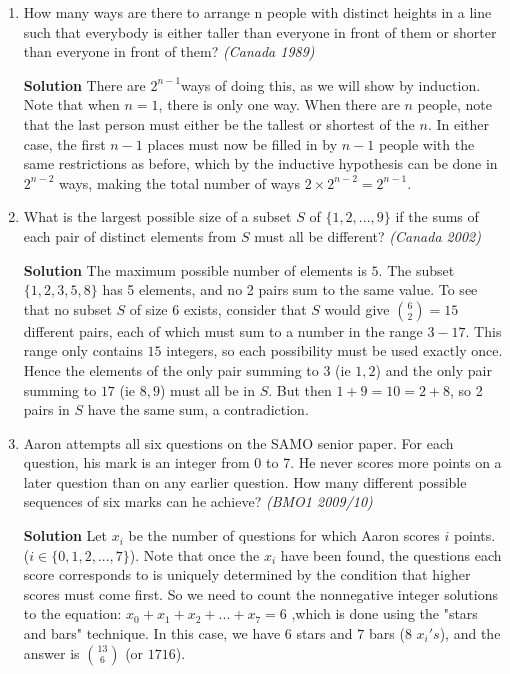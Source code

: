\documentclass[10pt,a4paper]{article}
\begin{document}
\begin{enumerate}

\item How many ways are there to arrange n people with distinct heights in a line such that everybody is either taller than everyone in front of them or shorter than everyone in front of them?
 \textit{(Canada 1989)} 

\textbf{Solution} There are ${2}^{n-1}$ways of doing this, as we will show by induction. Note that when $n=1$, there is only one way. When there are $n$ people, note that the last person must either be the tallest or shortest of the $n$. In either case, the first $n-1$ places must now be filled in by $n-1$ people with the same restrictions as before, which by the inductive hypothesis can be done in $2^{n-2}$ ways, making the total number of ways $2\times 2^{n-2} = 2^{n-1}$.

\item What is the largest possible size of a subset $S$ of $\{1,2,...,9\}$ if the sums of each pair of distinct elements from $S$ must all be different? 
\textit{(Canada 2002)}

\textbf{Solution} The maximum possible number of elements is $5$. The subset $\{1,2,3,5,8\}$ has 5 elements, and no 2 pairs sum to the same value. To see that no subset $S$ of size 6 exists, consider that $S$ would give $\binom{6}{2} = 15$ different pairs, each of which must sum to a number in the range $3-17$. This range only contains $15$ integers, so each possibility must be used exactly once. Hence the elements of the only pair summing to $3$ (ie $1,2$) and the only pair summing to $17$ (ie $8,9$) must all be in $S$. But then $1+9=10=2+8$, so 2 pairs in $S$ have the same sum, a contradiction.

\item Aaron attempts all six questions on the SAMO senior paper. For each question, his mark is an integer from 0 to 7. He never scores more points on a later question than on any earlier question. How many different possible sequences of six marks can he achieve? 
\textit{(BMO1 2009/10)}

\textbf{Solution} Let $x_i$ be the number of questions for which Aaron scores $i$ points. ($i\in\{0,1,2,...,7\}$). Note that once the $x_i$ have been found, the questions each score corresponds to is uniquely determined by the condition that higher scores must come first. So we need to count the nonnegative integer solutions to the equation: $x_0 + x_1 + x_2 + ... + x_7 = 6$ ,which is done using the "stars and bars" technique. In this case, we have $6$ stars and $7$ bars ($8$ $x_i's$), and the answer is $\binom{13}{6}$ (or $1716$).


\end{enumerate}
\end{document}
